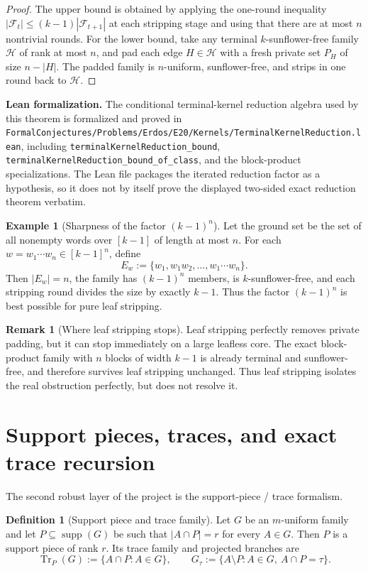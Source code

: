 \documentclass[11pt]{article}
\theoremstyle{definition}
\newtheorem{definition}[theorem]{Definition}
\newtheorem{example}[theorem]{Example}
\newtheorem{remark}[theorem]{Remark}
\newcommand{\Hh}{\mathcal{H}}
\newcommand{\Tr}{\operatorname{Tr}}
\newcommand{\supp}{\operatorname{supp}}
\newcommand{\1}{\mathbf{1}}
\newcommand{\leannote}[1]{\par\smallskip\noindent\textbf{Lean formalization.} #1\par\smallskip}
\begin{document}
\begin{proof}
The upper bound is obtained by applying the one-round inequality $|\mathcal F_t|\le (k-1)|\mathcal F_{t+1}|$ at each stripping stage and using that there are at most $n$ nontrivial rounds.
For the lower bound, take any terminal $k$-sunflower-free family $\Hh$ of rank at most $n$, and pad each edge $H\in \Hh$ with a fresh private set $P_H$ of size $n-|H|$. The padded family is $n$-uniform, sunflower-free, and strips in one round back to $\Hh$.
\end{proof}

\leannote{The conditional terminal-kernel reduction algebra used by this theorem is formalized and proved in \texttt{FormalConjectures/Problems/Erdos/E20/Kernels/TerminalKernelReduction.lean}, including \texttt{terminalKernelReduction\_bound}, \texttt{terminalKernelReduction\_bound\_of\_class}, and the block-product specializations. The Lean file packages the iterated reduction factor as a hypothesis, so it does not by itself prove the displayed two-sided exact reduction theorem verbatim.}

\begin{example}[Sharpness of the factor $(k-1)^n$]
Let the ground set be the set of all nonempty words over $[k-1]$ of length at most $n$. For each $w=w_1\cdots w_n\in [k-1]^n$, define
\[
E_w:=\{w_1,w_1w_2,\dots,w_1\cdots w_n\}.
\]
Then $|E_w|=n$, the family has $(k-1)^n$ members, is $k$-sunflower-free, and each stripping round divides the size by exactly $k-1$. Thus the factor $(k-1)^n$ is best possible for pure leaf stripping.
\end{example}

\begin{remark}[Where leaf stripping stops]
Leaf stripping perfectly removes private padding, but it can stop immediately on a large leafless core. The exact block-product family with $n$ blocks of width $k-1$ is already terminal and sunflower-free, and therefore survives leaf stripping unchanged. Thus leaf stripping isolates the real obstruction perfectly, but does not resolve it.
\end{remark}

\section{Support pieces, traces, and exact trace recursion}\label{sec:support-pieces}
The second robust layer of the project is the support-piece / trace formalism.

\begin{definition}[Support piece and trace family]
Let $G$ be an $m$-uniform family and let $P\subseteq \supp(G)$ be such that $|A\cap P|=r$ for every $A\in G$. Then $P$ is a support piece of rank $r$. Its trace family and projected branches are
\[
\Tr_P(G):=\{A\cap P:A\in G\},
\qquad
G_\tau:=\{A\setminus P:A\in G,\ A\cap P=\tau\}.
\]
\end{definition}
\end{document}

